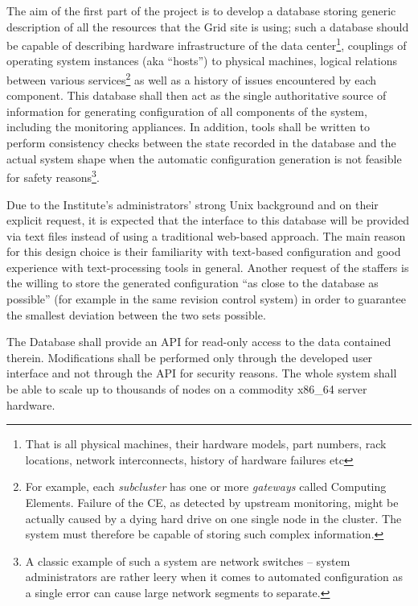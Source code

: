 \documentclass[12pt]{article}
\begin{document}
The aim of the first part of the project is to develop a database storing generic description of all the resources that the Grid
site is using; such a database should be capable of describing hardware infrastructure of the data center\footnote{That is all
physical machines, their hardware models, part numbers, rack locations, network interconnects, history of hardware failures etc},
couplings of operating system instances (aka ``hosts'') to physical machines, logical relations between various
services\footnote{For example, each {\em subcluster} has one or more {\em gateways} called Computing Elements.  Failure of the CE,
as detected by upstream monitoring, might be actually caused by a dying hard drive on one single node in the cluster.  The system
must therefore be capable of storing such complex information.} as well as a history of issues encountered by each component.
This database shall then act as the single authoritative source of information for generating configuration of all components of
the system, including the monitoring appliances.  In addition, tools shall be written to perform consistency checks between the
state recorded in the database and the actual system shape when the automatic configuration generation is not feasible for safety
reasons\footnote{A classic example of such a system are network switches -- system administrators are rather leery when it comes
to automated configuration as a single error can cause large network segments to separate.}.

Due to the Institute's administrators' strong Unix background and on their explicit request, it is expected that the interface to
this database will be provided via text files instead of using a traditional web-based approach.  The main reason for this design
choice is their familiarity with text-based configuration and good experience with text-processing tools in general.  Another
request of the staffers is the willing to store the generated configuration ``as close to the database as possible'' (for example
in the same revision control system) in order to guarantee the smallest deviation between the two sets possible.

The Database shall provide an API for read-only access to the data contained therein.  Modifications shall be performed only
through the developed user interface and not through the API for security reasons.  The whole system shall be able to scale up to
thousands of nodes on a commodity x86\_64 server hardware.
\end{document}
